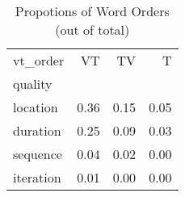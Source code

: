 \begin{table}[htbp!]
\centering
\caption{Propotions of Word Orders (out of total)}
\label{table:order_pr}
\begin{tabular}{lrrr}
\toprule
vt\_order &    VT &    TV &     T \\
quality   &       &       &       \\
\midrule
location  &  0.36 &  0.15 &  0.05 \\
duration  &  0.25 &  0.09 &  0.03 \\
sequence  &  0.04 &  0.02 &  0.00 \\
iteration &  0.01 &  0.00 &  0.00 \\
\bottomrule
\end{tabular}
\end{table}

